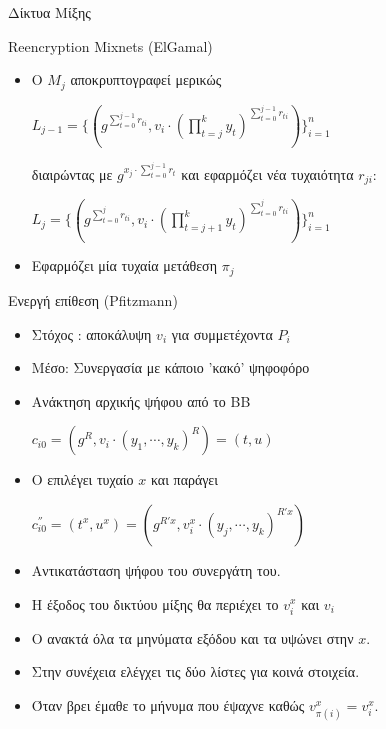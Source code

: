 \documentclass[handout]{beamer}
\begin{document}
\begin{section}{Δίκτυα Μίξης}
\begin{frame}{Reencryption Mixnets (ElGamal)}
\begin{itemize}
\begin{itemize}
        \item Ο $M_j$ αποκρυπτογραφεί μερικώς 
        \begin{center}
        $L_{j-1} = \{ (g^{\sum_{t=0}^{j-1} r_{ti}}, v_i \cdot (\prod_{t=j}^k y_t)^{\sum_{t=0}^{j-1} r_{ti}}) \}_{i=1}^n$ 
        \end{center}
        διαιρώντας με $g^{x_j \cdot {\sum_{t=0}^{j-1} r_t}}$ \pause και εφαρμόζει νέα τυχαιότητα $r_{ji}$: 
        \begin{center}
        $L_{j} = \{ (g^{\sum_{t=0}^{j} r_{ti}}, v_i \cdot (\prod_{t=j+1}^k y_t)^{\sum_{t=0}^{j} r_{ti}}) \}_{i=1}^n$
        \end{center} \pause
        \item Εφαρμόζει μία τυχαία μετάθεση $\pi_j$ 
        \end{itemize} 
    \end{itemize} 
\end{frame}

\begin{frame}{Ενεργή επίθεση (Pfitzmann)}
    \begin{itemize}
\item Στόχος \adv: αποκάλυψη $v_i$ για συμμετέχοντα $P_i$ \pause  
\item Μέσο: Συνεργασία με κάποιο 'κακό' ψηφοφόρο \pause 
\item Ανάκτηση αρχικής ψήφου από το ΒΒ  \pause 
\begin{center}
$c_{i0} = (g^R, v_i \cdot (y_1,\cdots,y_k)^R) = (t,u)$ 
\end{center}
\item Ο  \adv επιλέγει τυχαίο $x$ και παράγει \pause 
\begin{center}
$c^{''}_{i0} = (t^x,u^x)=( g^{R'x}, v_{i}^{x} \cdot (y_j,\cdots,y_k)^{R'x} )$ 
\end{center}
\item Αντικατάσταση ψήφου του συνεργάτη του. \pause 
\item Η έξοδος του δικτύου μίξης θα περιέχει  το $v_{i}^{x}$  και $v_{i}$ \pause 
\item Ο \adv ανακτά όλα τα μηνύματα εξόδου και τα υψώνει στην $x$. \pause 
\item Στην συνέχεια ελέγχει τις δύο λίστες για κοινά στοιχεία. \pause 
\item Όταν βρει έμαθε το μήνυμα που έψαχνε καθώς $v_{\pi(i)}^x = v_i^x$. 
\end{itemize}
\end{frame}


\end{section}
\end{document}

